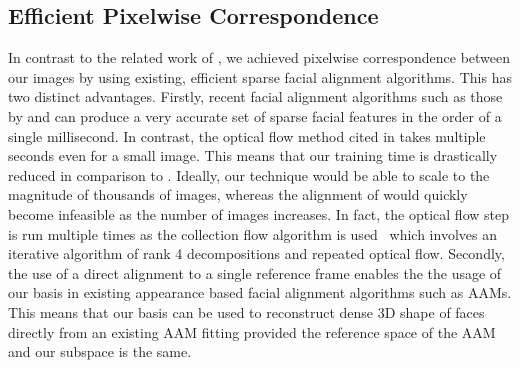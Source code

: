 \subsection{Efficient Pixelwise Correspondence}\label{subsec:imag_coll_correspondence}
In contrast to the related work of \citet{KemelmacherShlizerman:2013iv},
we achieved pixelwise correspondence between our images by using existing,
efficient sparse facial alignment algorithms. This has two distinct advantages.
Firstly, recent facial alignment algorithms such as those by
\citet{ren2014face} and \citet{kazemi2014one} can produce a very accurate set
of sparse facial features in the order of a single millisecond. In contrast, the
optical flow method cited in \citet{KemelmacherShlizerman:2013iv} takes multiple seconds even for
a small image. This means that our training time is drastically reduced in
comparison to \citet{KemelmacherShlizerman:2013iv}. Ideally, our technique would be able to scale
to the magnitude of thousands of images, whereas the alignment of
\citet{KemelmacherShlizerman:2013iv} would quickly become infeasible as the number of images
increases. In fact, the optical flow step is run multiple times as the
collection flow algorithm is used~\cite{kemelmacher2012collection} which involves an
iterative algorithm of rank 4 decompositions and repeated optical flow.
Secondly, the use of a direct alignment to a single reference frame enables the
the usage of our basis in existing appearance based facial alignment algorithms
such as AAMs. This means that our basis can be used to reconstruct dense 3D
shape of faces directly from an existing AAM fitting provided the reference
space of the AAM and our subspace is the same.
